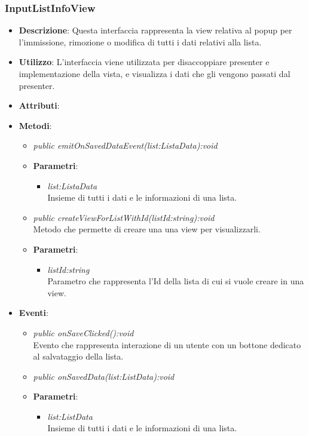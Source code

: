 \subsubsection{InputListInfoView}
\begin{itemize}
\item \textbf{Descrizione}: Questa interfaccia rappresenta la view relativa al popup per l'immissione, rimozione o modifica di tutti i dati relativi alla lista.
\item \textbf{Utilizzo}: L'interfaccia viene utilizzata per disaccoppiare presenter e implementazione della vista, e visualizza i dati che gli vengono passati dal presenter.
\item \textbf{Attributi}: 
\item \textbf{Metodi}:
	\begin{itemize}	
	\item \textit{public emitOnSavedDataEvent(list:ListaData):void}\\
	
			\item{\textbf{Parametri}: \begin{itemize}
			\item \textit{list:ListaData}\\
			Insieme di tutti i dati e le informazioni di una lista.
			\end{itemize}}
	\item \textit{public createViewForListWithId(listId:string):void}\\
	Metodo che permette di creare una una view per visualizzarli.
			\item{\textbf{Parametri}: \begin{itemize}
			\item \textit{listId:string}\\
			Parametro che rappresenta l'Id della lista di cui si vuole creare in una view.
			\end{itemize}}
	\end{itemize}
\item \textbf{Eventi}:
	\begin{itemize}
	\item \textit{public onSaveClicked():void}\\
	Evento che rappresenta interazione di un utente con un bottone dedicato al salvataggio della lista.
	\item \textit{public onSavedData(list:ListData):void}\\

			\item{\textbf{Parametri}: \begin{itemize}
			\item \textit{list:ListData}\\
			Insieme di tutti i dati e le informazioni di una lista.
			\end{itemize}}
	\end{itemize}
\end{itemize}

